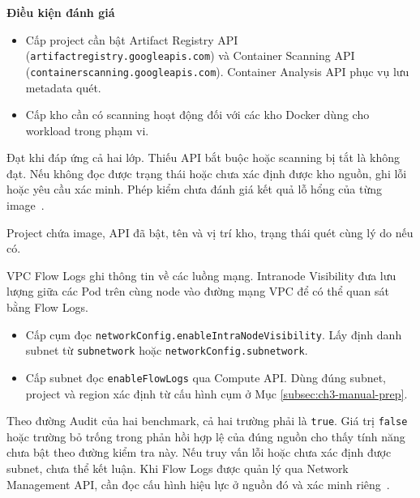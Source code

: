 \par\smallskip\noindent
\begin{minipage}{\linewidth}
\textbf{Điều kiện đánh giá}\par
\begin{itemize}[leftmargin=1.1cm,itemsep=0pt,topsep=3pt]
  \item Cấp project cần bật Artifact Registry API (\texttt{artifactregistry.\allowbreak googleapis.com}) và Container Scanning API (\texttt{containerscanning.\allowbreak googleapis.com}). Container Analysis API phục vụ lưu metadata quét.
  \item Cấp kho cần có scanning hoạt động đối với các kho Docker dùng cho workload trong phạm vi.
\end{itemize}
\noindent Đạt khi đáp ứng cả hai lớp. Thiếu API bắt buộc hoặc scanning bị tắt là không đạt. Nếu không đọc được trạng thái hoặc chưa xác định được kho nguồn, ghi lỗi hoặc yêu cầu xác minh. Phép kiểm chưa đánh giá kết quả lỗ hổng của từng image~\mbox{\parencites[tr.~95--96]{cis-gke-standard-v2}[tr.~70--71]{cis-gke-autopilot-v2}}.
\end{minipage}
\par

Project chứa image, API đã bật, tên và vị trí kho, trạng thái quét cùng lý do nếu có.

VPC Flow Logs ghi thông tin về các luồng mạng. Intranode Visibility đưa lưu lượng giữa các Pod trên cùng node vào đường mạng VPC để có thể quan sát bằng Flow Logs.

\begin{itemize}[leftmargin=1.1cm,itemsep=0pt,topsep=3pt]
  \item Cấp cụm đọc \texttt{networkConfig.\allowbreak enableIntraNodeVisibility}. Lấy định danh subnet từ \texttt{subnetwork} hoặc \texttt{networkConfig.subnetwork}.
  \item Cấp subnet đọc \texttt{enableFlowLogs} qua Compute API. Dùng đúng subnet, project và region xác định từ cấu hình cụm ở Mục \ref{subsec:ch3-manual-prep}.
\end{itemize}

Theo đường Audit của hai benchmark, cả hai trường phải là \texttt{true}. Giá trị \texttt{false} hoặc trường bỏ trống trong phản hồi hợp lệ của đúng nguồn cho thấy tính năng chưa bật theo đường kiểm tra này. Nếu truy vấn lỗi hoặc chưa xác định được subnet, chưa thể kết luận. Khi Flow Logs được quản lý qua Network Management API, cần đọc cấu hình hiệu lực ở nguồn đó và xác minh riêng~\mbox{\parencites[tr.~145--146]{cis-gke-standard-v2}[tr.~88--89]{cis-gke-autopilot-v2}}.

